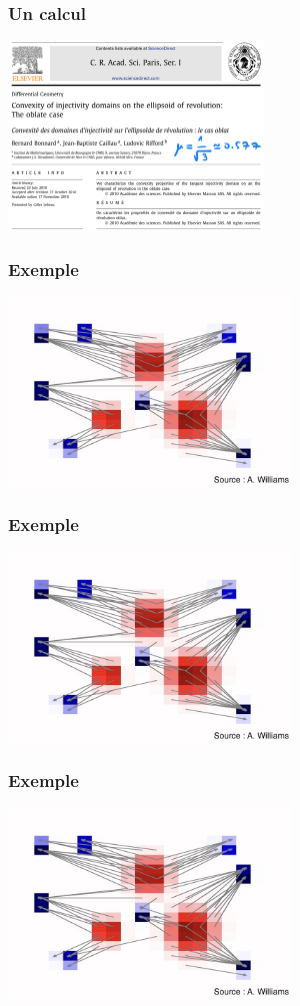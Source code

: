 \documentclass[9pt]{beamer}
\begin{document}
\begin{frame}
\frametitle{\bf Un calcul}
 
\centering \includegraphics[height=5.0cm]{cras2}

\end{frame}

\begin{frame}
\frametitle{\bf Exemple}
 
\centering \includegraphics[height=5.0cm]{ex3}

\end{frame}

\begin{frame}
\frametitle{\bf Exemple}
 
\centering \includegraphics[height=5.0cm]{ex3}

\end{frame}

\begin{frame}
\frametitle{\bf Exemple}
 
\centering \includegraphics[height=5.0cm]{ex3}

\end{frame}

\end{document}
